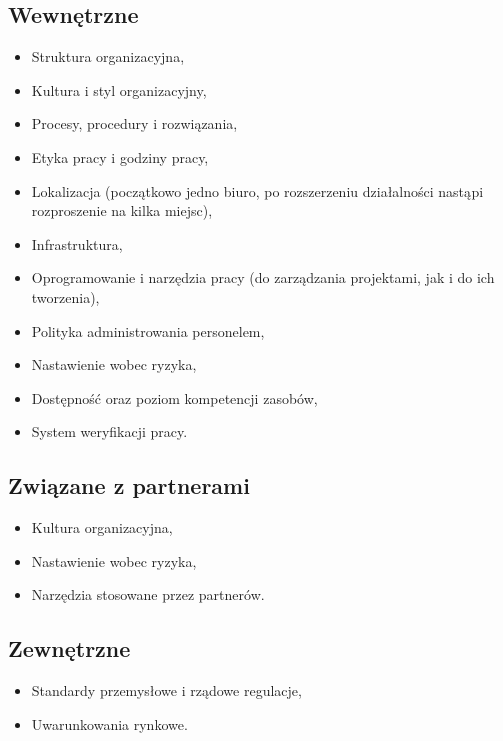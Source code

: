\subsection*{Wewnętrzne}

\begin{itemize}
\item Struktura organizacyjna,
\item Kultura i styl organizacyjny,
\item Procesy, procedury i rozwiązania,
\item Etyka pracy i godziny pracy,
\item Lokalizacja (początkowo jedno biuro, po rozszerzeniu działalności nastąpi rozproszenie na kilka miejsc),
\item Infrastruktura,
\item Oprogramowanie i narzędzia pracy (do zarządzania projektami, jak i do ich tworzenia),
\item Polityka administrowania personelem,
\item Nastawienie wobec ryzyka,
\item Dostępność oraz poziom kompetencji zasobów,
\item System weryfikacji pracy.
\end{itemize}

\subsection*{Związane z partnerami}

\begin{itemize}
\item Kultura organizacyjna,
\item Nastawienie wobec ryzyka,
\item Narzędzia stosowane przez partnerów.
\end{itemize}

\subsection*{Zewnętrzne}

\begin{itemize}
\item Standardy przemysłowe i rządowe regulacje,
\item Uwarunkowania rynkowe.
\end{itemize}

